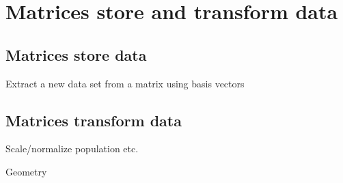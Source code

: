 \documentclass{ximera}
\begin{document}
\begin{example}
\begin{solution}
\begin{image}
  \end{image}

\end{solution}
\end{example}



\section{Matrices store and transform data}


\subsection{Matrices store data}

Extract a new data set from a matrix using basis vectors

\subsection{Matrices transform data}

Scale/normalize population etc.


Geometry
\end{document}

